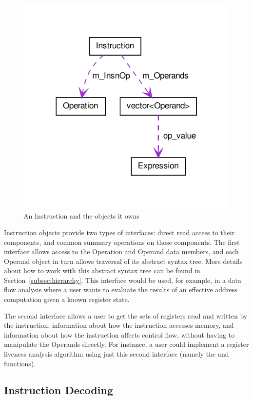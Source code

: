 \begin{figure}
\centering
    \includegraphics{fig/ownership_graph}
\caption{An Instruction and the objects it owns}
\label{fig:ownership-graph}
\end{figure}

Instruction objects provide two types of interfaces: direct read access to their
components, and common summary operations on those components. The first
interface allows access to the Operation and Operand data members, and each
Operand object in turn allows traversal of its abstract syntax tree. More
details about how to work with this abstract syntax tree can be found in
Section~\ref{subsec:hierarchy}.
This interface would be used, for example, in a data flow analysis where a user wants
to evaluate the results of an effective address computation given a known
register state.

The second interface allows a user to get the sets of registers read and written
by the instruction, information about how the instruction accesses memory, and
information about how the instruction affects control flow, without having to
manipulate the Operands directly. For instance, a user could implement a
register liveness analysis algorithm using just this second interface (namely
the  and  functions).

\subsection{Instruction Decoding}

